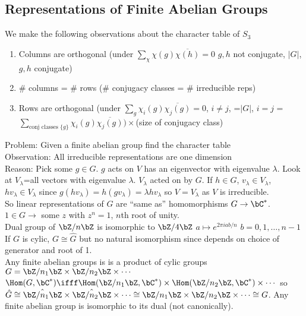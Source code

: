 
\subsection{Representations of Finite Abelian Groups}

We make the following observations about the character table of $S_3$ 
\begin{enumerate}
    \item Columns are orthogonal (under $\sum_{\chi} \chi(g)\overline{\chi(h)}=0$ $g,h$ not conjugate, $|G|$, $g,h$ conjugate) 
    \item \# columns = \# rows (\# conjugacy classes = \# irreducible reps) 
    \item Rows are orthogonal (under $\sum_{g}\chi_i(g)\overline{\chi_j(g)} = 0$, $i \neq j$, =$|G|$, $i=j$ = $\sum_{\text{conj classes } \{g\}} \chi_i(g)\overline{\chi_j(g)})\times $(size of conjugacy class)
\end{enumerate}

\noindent
Problem: Given a finite abelian group find the character table \\
Observation: All irreducible representations are one dimension \\
Reason: Pick some $g \in G$. $g$ acts on $V$ has an eigenvector with eigenvalue $\lambda$. Look at $V_{\lambda}$=all vectors with eigenvalue $\lambda$. $V_{\lambda}$ acted on by $G$. If $h \in G$, $v_{\lambda} \in V_{\lambda}$, $hv_{\lambda} \in V_{\lambda}$ since $g(hv_{\lambda}) = h(g v_{\lambda}) = \lambda h v_{\lambda}$ so $V=V_{\lambda}$ as $V$ is irreducible. \\

\noindent
So linear representations of $G$ are ``same as'' homomorphisms $G \to \bC^*$. $1 \in G \to $ some $z$ with $ z^n=1$, $n$th root of unity. \\
Dual group of $\bZ/n\bZ$ is isomorphic to $\bZ/4\bZ$ $a \mapsto e^{2 \pi i a b/n}$ $b=0, 1, \ldots, n-1$ \\
If $G$ is cylic, $G \cong \hat{G}$ but no natural isomorphism since depends on choice of generator and root of 1. \\
Any finite abelian groups is is a product of cylic groups $G  =\bZ/n_1\bZ \times \bZ/n_2\bZ \times \cdots$ \\
$\Hom(G, \bC^*) \ifff \Hom(\bZ/n_1\bZ, \bC^*) \times \Hom(\bZ/n_2\bZ, \bC^*) \times \cdots$ so $\hat{G} \cong \hat{\bZ/n_1\bZ} \times \hat{\bZ/n_2\bZ} \times \cdots \cong \bZ/n_1\bZ \times \bZ/n_2\bZ \times \cdots \cong G$. Any finite  abelian group is isomorphic to its dual (not canonically).

